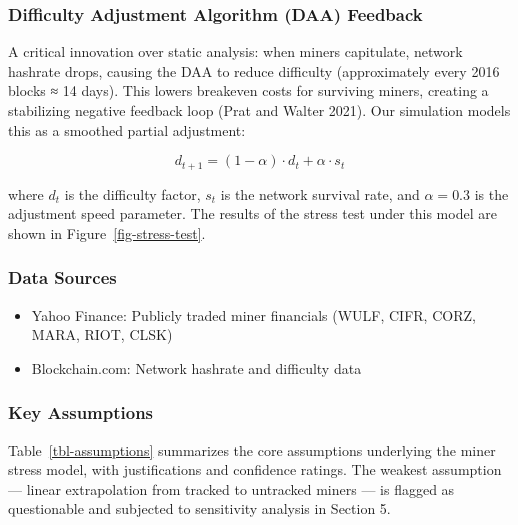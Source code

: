 \documentclass[
  11pt,
]{article}
\providecommand{\tightlist}{%
  \setlength{\itemsep}{0pt}\setlength{\parskip}{0pt}}\usepackage{longtable,booktabs,array}
\begin{document}
\hypertarget{difficulty-adjustment-algorithm-daa-feedback}{%
\subsubsection{Difficulty Adjustment Algorithm (DAA)
Feedback}\label{difficulty-adjustment-algorithm-daa-feedback}}

A critical innovation over static analysis: when miners capitulate,
network hashrate drops, causing the DAA to reduce difficulty
(approximately every 2016 blocks ≈ 14 days). This lowers breakeven costs
for surviving miners, creating a stabilizing negative feedback loop
(Prat and Walter 2021). Our simulation models this as a smoothed partial
adjustment:

\[d_{t+1} = (1-\alpha) \cdot d_t + \alpha \cdot s_t\]

where \(d_t\) is the difficulty factor, \(s_t\) is the network survival
rate, and \(\alpha = 0.3\) is the adjustment speed parameter. The
results of the stress test under this model are shown in
Figure~\ref{fig-stress-test}.

\hypertarget{data-sources}{%
\subsubsection{Data Sources}\label{data-sources}}

\begin{itemize}
\tightlist
\item
  Yahoo Finance: Publicly traded miner financials (WULF, CIFR, CORZ,
  MARA, RIOT, CLSK)
\item
  Blockchain.com: Network hashrate and difficulty data
\end{itemize}

\hypertarget{key-assumptions}{%
\subsubsection{Key Assumptions}\label{key-assumptions}}

Table~\ref{tbl-assumptions} summarizes the core assumptions underlying
the miner stress model, with justifications and confidence ratings. The
weakest assumption --- linear extrapolation from tracked to untracked
miners --- is flagged as questionable and subjected to sensitivity
analysis in Section 5.
\end{document}
